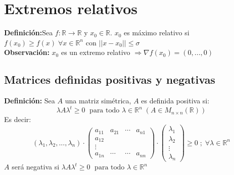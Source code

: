 \documentclass[11pt]{article}
\newcommand{\R}{\mathbb{R}}
\theoremstyle{plain}
\begin{document}

    \section{Extremos relativos} %
    \label{sec:extremos_relativos}
    \textbf{Definición:}Sea $f:\R\rightarrow \R$ y $x_0 \in \R$. $x_0$ es máximo relativo si $f(x_0) \ge f(x) \; \forall x \in \R^n$ con $||x-x_0|| \le \sigma$\\
    \textbf{Observación:} $x_0$ es un extremo relativo $\Rightarrow \nabla f(x_0) = (0,...,0)$\\

    \subsection{Matrices definidas positivas y negativas} %
    \label{sub:matrices_definidas_positivas_y_negativas}
        \textbf{Definición:} Sea $A$ una matriz simétrica, $A$ es definida positiva si:
        \[\lambda A \lambda^t \ge 0 \; \text{ para todo } \lambda \in \R^n \; (A\in M_{n\times n} (\R))\]
        Es decir:
        \begin{equation}
            (\lambda_1, \lambda_2,... ,\lambda_n)\cdot
            \begin{pmatrix}
                a_{11} & a_{21} & \cdots& a_{n1}\\
                a_{12}&&&\\
                \vdots&&&\\
                a_{1n}& \cdots &\cdots& a_{nn}
            \end{pmatrix}
            \cdot
            \begin{pmatrix}
                \lambda_1\\
                \lambda_2\\
                \vdots\\
                \lambda_n
            \end{pmatrix}
            \ge 0 \; ; \; \forall \lambda \in \R^n
        \end{equation}
        $A$ será negativa si $\lambda A \lambda^t \ge 0 \; \text{ para todo } \lambda \in \R^n$\\\\
\end{document}
